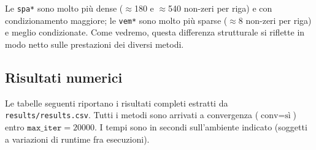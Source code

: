 \documentclass[11pt,a4paper]{article}
\begin{document}
Le \texttt{spa*} sono molto più dense ($\approx$180 e $\approx$540 non-zeri per
riga) e con condizionamento maggiore; le \texttt{vem*} sono molto più sparse
($\approx$8 non-zeri per riga) e meglio condizionate. Come vedremo, questa
differenza strutturale si riflette in modo netto sulle prestazioni dei diversi
metodi.

\subsection{Risultati numerici}
Le tabelle seguenti riportano i risultati completi estratti da
\texttt{results/results.csv}. Tutti i metodi sono arrivati a convergenza
($\text{conv}=\text{sì}$) entro $\texttt{max\_iter}=20000$. I tempi sono in
secondi sull'ambiente indicato (soggetti a variazioni di runtime fra esecuzioni).
\end{document}
